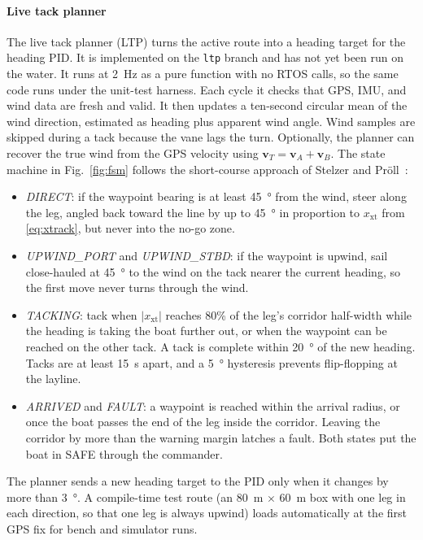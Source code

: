 \paragraph*{Live tack planner}
The live tack planner (LTP) turns the active route into a heading target for
the heading PID. It is implemented on the \texttt{ltp} branch and has not yet
been run on the water. It runs at \SI{2}{\hertz} as a pure function with no
RTOS calls, so the same code runs under the unit-test harness. Each cycle it
checks that GPS, IMU, and wind data are fresh and valid. It then updates a
ten-second circular mean of the wind direction, estimated as heading plus
apparent wind angle. Wind samples are skipped during a tack because the vane
lags the turn. Optionally, the planner can recover the true wind from the GPS
velocity using $\mathbf{v}_T = \mathbf{v}_A + \mathbf{v}_B$. The state
machine in Fig.~\ref{fig:fsm} follows the short-course approach of Stelzer and
Pr\"oll~\cite{stelzer2008}:
\begin{itemize}
\item \emph{DIRECT}: if the waypoint bearing is at least
\SI{45}{\degree} from the wind, steer along the leg, angled back toward the
line by up to \SI{45}{\degree} in proportion to $x_{\mathrm{xt}}$ from
\eqref{eq:xtrack}, but never into the no-go zone.
\item \emph{UPWIND\_PORT} and \emph{UPWIND\_STBD}: if the waypoint is upwind,
sail close-hauled at \SI{45}{\degree} to the wind on the tack nearer the
current heading, so the first move never turns through the wind.
\item \emph{TACKING}: tack when $|x_{\mathrm{xt}}|$ reaches 80\% of the leg's
corridor half-width while the heading is taking the boat further out, or when
the waypoint can be reached on the other tack. A tack is complete within
\SI{20}{\degree} of the new heading. Tacks are at least \SI{15}{\second}
apart, and a \SI{5}{\degree} hysteresis prevents flip-flopping at the layline.
\item \emph{ARRIVED} and \emph{FAULT}: a waypoint is reached within the
arrival radius, or once the boat passes the end of the leg inside the
corridor. Leaving the corridor by more than the warning margin latches a fault.
Both states put the boat in SAFE through the commander.
\end{itemize}
The planner sends a new heading target to the PID only when it changes by
more than \SI{3}{\degree}. A compile-time test route (an
\SI{80}{\meter} $\times$ \SI{60}{\meter} box with one leg in each direction, so
that one leg is always upwind) loads automatically at the first GPS fix for
bench and simulator runs.

